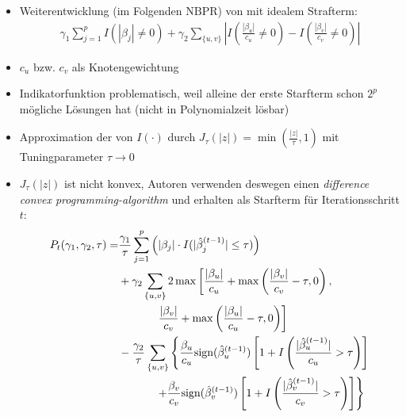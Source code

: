 \documentclass{beamer}
\begin{document}
\begin{frame}
	\begin{itemize}
	\item Weiterentwicklung (im Folgenden $\text{NBPR}$) von \cite{kim_network-based_2013} mit {\glqq}idealem{\grqq} Strafterm:
	\begin{align*}
	\gamma_1 \sum_{j=1}^{p}I(|\beta_j|\neq 0) + \gamma_2 \sum_{\{u,v\}}\left| I\left( \frac{|\beta_u|}{c_u} \neq 0 \right) - I\left( \frac{|\beta_v|}{c_v} \neq 0 \right) \right|
	\end{align*}
	\item $c_u$ bzw. $c_v$ als Knotengewichtung
	\item Indikatorfunktion problematisch, weil
	alleine der erste Starfterm schon $2^p$ mögliche Lösungen hat (nicht in Polynomialzeit lösbar)
	\item Approximation der von $I(\cdot)$ durch  $J_\tau(|z|)=\min (\frac{|z|}{\tau}, 1)$ mit Tuningparameter $\tau \rightarrow 0$
	\end{itemize}
\end{frame}


\begin{frame}
	\begin{itemize}
	\item $J_\tau(|z|)$ ist nicht konvex, Autoren verwenden deswegen einen \textit{difference convex programming-algorithm} und erhalten als Starfterm für Iterationsschritt $t$:
	\begin{align*}
	P_t(\gamma_1, \gamma_2, \tau) =& \frac{\gamma_1}{\tau} \sum_{j=1}^{p}\left(|\beta_j|\cdot I(|\hat{\beta}_j^{(t-1)}| \leq \tau)\right) \notag \\
	&+ \gamma_2 \sum_{\{u,v\}} 2\max \left[\frac{|\beta_u|}{c_u}+\max\left(\frac{|\beta_v|}{c_v}-\tau, 0\right), \right. \\
	&\phantom{{}=1111} \left.\frac{|\beta_v|}{c_v}+\max\left(\frac{|\beta_u|}{c_u}-\tau, 0\right)\right] \notag \\
	&- \frac{\gamma_2}{\tau} \sum_{\{u,v\}} \left\lbrace
	\frac{\beta_u}{c_u}\text{sign}(\hat{\beta}_u^{(t-1)}) \left[1+I\left(\frac{|\hat{\beta}_u^{(t-1)}|}{c_u}>\tau \right) \right] \right. \notag \\
	&\phantom{{}=1111} \left. + 
	\frac{\beta_v}{c_v}\text{sign}(\hat{\beta}_v^{(t-1)})\left[1+I\left(\frac{|\hat{\beta}_v^{(t-1)}|}{c_v}>\tau \right) \right]
	\right\rbrace
	\end{align*}
	\end{itemize}
\end{frame}
\end{document}
